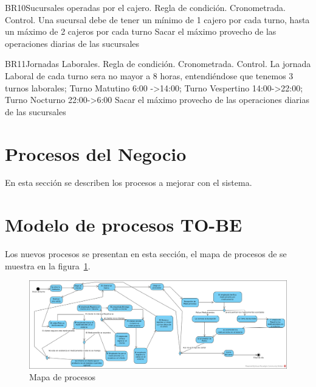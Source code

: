 \begin{BussinesRule}{BR10}{Sucursales operadas por el cajero.}
	\BRitem[Tipo:] Regla de condición. 
	\BRitem[Clase:] Cronometrada. 
	\BRitem[Nivel:] Control. %
	\BRitem[Descripción:] Una sucursal debe de tener un mínimo de 1 cajero por cada turno, hasta un máximo de 2 cajeros por cada turno
	\BRitem[Motivación:] Sacar el máximo provecho de las operaciones diarias de las sucursales 
\end{BussinesRule}

\begin{BussinesRule}{BR11}{Jornadas Laborales.}
	\BRitem[Tipo:] Regla de condición. 
	\BRitem[Clase:] Cronometrada. 
	\BRitem[Nivel:] Control. %
	\BRitem[Descripción:] La jornada Laboral de cada turno sera no mayor a 8 horas, entendiéndose que tenemos 3 turnos laborales; Turno Matutino 6:00 ->14:00; Turno Vespertino 14:00->22:00; Turno Nocturno 22:00->6:00
	\BRitem[Motivación:] Sacar el máximo provecho de las operaciones diarias de las sucursales 
\end{BussinesRule}
\newpage


\section{Procesos del Negocio}
En esta sección se describen los procesos a mejorar con el sistema.




\section{Modelo de procesos TO-BE}

Los nuevos procesos se presentan en esta sección, el mapa de procesos de se muestra en la figura~\ref{fig:mapaProc}.

\begin{figure}[htbp]
	\begin{center}
		\includegraphics[width=.8\textwidth]{images/procMap}
		\caption{Mapa de procesos}
		\label{fig:mapaProc}
	\end{center}
\end{figure}


















